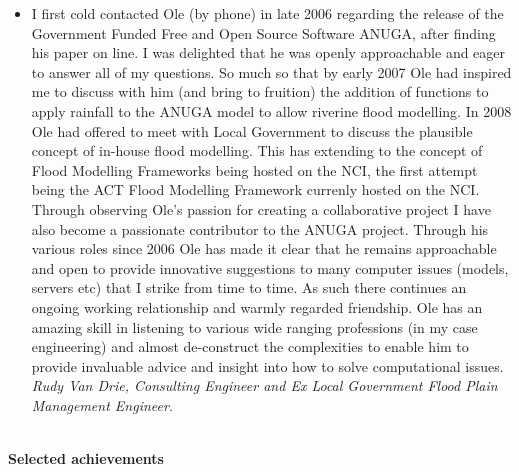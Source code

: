 \documentclass[11pt,a4paper]{article}
\begin{document}
\begin{itemize}
\item
  I first cold contacted Ole (by phone) in late 2006 regarding the release of the Government Funded Free and Open Source Software ANUGA, after finding his paper on line. I was delighted that he was openly approachable and eager to answer all of my questions. So much so that by early 2007 Ole had inspired me to discuss with him (and bring to fruition) the addition of functions to apply rainfall to the ANUGA model to allow riverine flood modelling. In 2008 Ole had offered to meet with Local Government to discuss the plausible concept of in-house flood modelling. This has extending to the concept of Flood Modelling Frameworks being hosted on the NCI, the first attempt being the ACT Flood Modelling Framework currenly hosted on the NCI.  
Through observing Ole's passion for creating a collaborative project I have also become a passionate contributor to the ANUGA project. Through his various roles since 2006 Ole has made it clear that he remains approachable and open to provide innovative suggestions to many computer issues (models, servers etc) that I strike from time to time. As such there continues an ongoing working relationship and warmly regarded friendship. Ole has an amazing skill in listening to various wide ranging professions (in my case engineering) and almost de-construct the complexities to enable him to provide invaluable advice and insight into how to solve computational issues.  
\emph{Rudy Van Drie, Consulting Engineer and Ex Local Government Flood Plain Management Engineer.}
  
\end{itemize}


\begin{center}
  \hrulefill \\
  {\bf Selected achievements} \\[-0.2cm]
  \hrulefill
\end{center}
\end{document}
